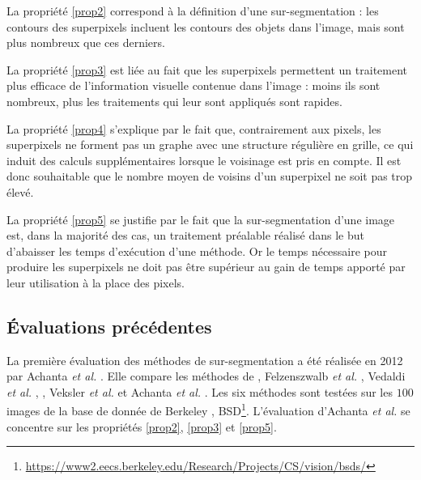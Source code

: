 La propriété \ref{prop2} correspond à la définition d'une sur-segmentation : les contours des superpixels incluent les contours des objets dans l'image, mais sont plus nombreux que ces derniers. 

La propriété \ref{prop3} est liée au fait que les superpixels permettent un traitement plus efficace de l'information visuelle contenue dans l'image : moins ils sont nombreux, plus les traitements qui leur sont appliqués sont rapides. 

La propriété \ref{prop4} s'explique par le fait que, contrairement aux pixels, les superpixels ne forment pas un graphe avec une structure régulière en grille, ce qui induit des calculs supplémentaires lorsque le voisinage est pris en compte. Il est donc souhaitable que le nombre moyen de voisins d'un superpixel ne soit pas trop élevé.  

La propriété \ref{prop5} se justifie par le fait que la sur-segmentation d'une image est, dans la majorité des cas, un traitement préalable réalisé dans le but d'abaisser les temps d'exécution d'une méthode. Or le temps nécessaire pour produire les superpixels ne doit pas être supérieur au gain de temps apporté par leur utilisation à la place des pixels. 


\subsection{Évaluations précédentes}
\label{subsec:evalSpStatOfTheArt}

La première évaluation des méthodes de sur-segmentation a été réalisée en 2012 par Achanta \textit{et al.} \cite{achanta2012slic}. Elle compare les méthodes de , Felzenszwalb \textit{et al.} \cite{felzenszwalb2004efficient}, Vedaldi \textit{et al.} \cite{vedaldi2008quick}, , Veksler \textit{et al.} \cite{veksler2010superpixels} et Achanta \textit{et al.} \cite{achanta2012slic}. Les six méthodes sont testées sur les $100$ images de la base de donnée de Berkeley \cite{MartinFTM01}, BSD\footnote{\url{https://www2.eecs.berkeley.edu/Research/Projects/CS/vision/bsds/}}. L'évaluation d'Achanta \textit{et al.} se concentre sur les propriétés \ref{prop2}, \ref{prop3} et \ref{prop5}.  


